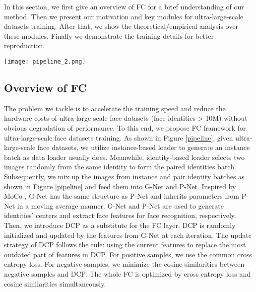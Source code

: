 


























In this section, we first give an overview of FC for a brief understanding of our method.
Then we present our motivation and key modules for ultra-large-scale datasets training.
After that, we show the theoretical/empirical analysis over these modules.
Finally we demonstrate the training details for better reproduction.

\begin{figure*}[htp]
\centering
\texttt{[image: pipeline\_2.png]}
\caption{The pipeline of FC. We use instance and id data loader to generate mixed batches (I  III, II  IV), which are later fed into G-Net and P-Net respectively. The features from G-Net will update DCP in the manner of LRU, and features from P-Net will be used to compute loss together with DCP.}


\label{pipeline}
\end{figure*}


\subsection{Overview of FC}
The problem we tackle is to accelerate the training speed and reduce the hardware costs of ultra-large-scale face datasets (face identities > 10M) without obvious degradation of performance. 
To this end, we propose FC framework for ultra-large-scale face datasets training.
As shown in Figure \ref{pipeline}, given ultra-large-scale face datasets, we utilize instance-based loader to generate an instance batch as data loader usually does. Meanwhile, identity-based loader selects two images randomly from the same identity to form the paired identities batch.
Subsequently, we mix up the images from instance and pair identity batches as shown in Figure \ref{pipeline} and feed them into G-Net and P-Net.
Inspired by MoCo \cite{he2020momentum}, G-Net has the same structure as P-Net and inherits parameters from P-Net in a moving average manner.
G-Net and P-Net are used to generate identities' centers and extract face features for face recognition, respectively.
Then, we introduce DCP as a substitute for the FC layer.
DCP is randomly initialized and updated by the features from G-Net at each iteration.
The update strategy of DCP follows the rule: using the current features to replace the most outdated part of features in DCP. For positive samples, we use the common cross entropy loss. For negative samples, we minimize the cosine similarities between negative samples and DCP. The whole FC is optimized by cross entropy loss and cosine similarities simultaneously.









